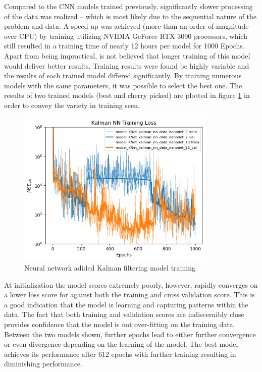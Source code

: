 \documentclass[a4paper,twoside,12pt]{report}
\begin{document}
Compared to the CNN models trained previously, significantly slower processing of the data was realized -- which is most likely due to the sequential nature of the problem and data. A speed up was achieved (more than an order of magnitude over CPU) by training utilizing NVIDIA GeForce RTX 3090 processors, which still resulted in a training time of nearly 12 hours per model for 1000 Epochs. Apart from being impractical, is not believed that longer training of this model would deliver better results. Training results were found be highly variable and the results of each trained model differed significantly. By training numerous models with the same parameters, it was possible to select the best one. The results of two trained models (best and cherry picked) are plotted in figure \ref{fig:RNNtrain} in order to convey the variety in training seen.

\begin{figure}[h!]
\begin{center}
\includegraphics[width=9.5cm]{images/knet_train.png}
\caption{Neural network adided Kalman filtering model training}
\label{fig:RNNtrain}
\end{center}
\end{figure}

At initialization the model scores extremely poorly, however, rapidly converges on a lower loss score for against both the training and cross validation score. This is a good indication that the model is learning and capturing patterns within the data. The fact that both training and validation scores are indiscernibly close provides confidence that the model is not over-fitting on the training data. Between the two models shown, further epochs lead to either further convergence or even divergence depending on the learning of the model. The best model achieves its performance after 612 epochs with further training resulting in diminishing performance.
\end{document}
